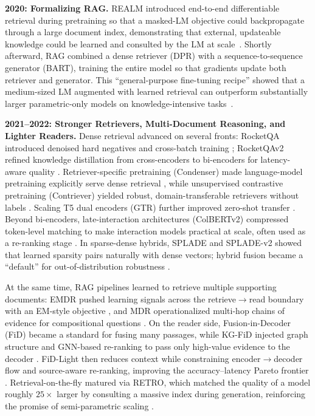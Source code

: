 \textbf{2020: Formalizing RAG.}
REALM introduced end-to-end differentiable retrieval during pretraining so that a masked-LM objective could backpropagate through a large document index, demonstrating that external, updateable knowledge could be learned and consulted by the LM at scale~\cite{realm2020}. Shortly afterward, RAG combined a dense retriever (DPR) with a sequence-to-sequence generator (BART), training the entire model so that gradients update both retriever and generator. This ``general-purpose fine-tuning recipe'' showed that a medium-sized LM augmented with learned retrieval can outperform substantially larger parametric-only models on knowledge-intensive tasks~\cite{lewis2020rag}.

\textbf{2021--2022: Stronger Retrievers, Multi-Document Reasoning, and Lighter Readers.}
Dense retrieval advanced on several fronts: RocketQA introduced denoised hard negatives and cross-batch training \cite{rocketqa2021}; RocketQAv2 refined knowledge distillation from cross-encoders to bi-encoders for latency-aware quality \cite{rocketqa2_2021}. Retriever-specific pretraining (Condenser) made language-model pretraining explicitly serve dense retrieval \cite{condenser2021}, while unsupervised contrastive pretraining (Contriever) yielded robust, domain-transferable retrievers without labels \cite{contriever2021}. Scaling T5 dual encoders (GTR) further improved zero-shot transfer \cite{gtr2021}. Beyond bi-encoders, late-interaction architectures (ColBERTv2) compressed token-level matching to make interaction models practical at scale, often used as a re-ranking stage \cite{colbertv2_2021}. In sparse-dense hybrids, SPLADE and SPLADE-v2 showed that learned sparsity pairs naturally with dense vectors; hybrid fusion became a ``default'' for out-of-distribution robustness \cite{splade2021, formal2021splade}.

At the same time, RAG pipelines learned to retrieve multiple supporting documents: EMDR pushed learning signals across the retrieve$\rightarrow$read boundary with an EM-style objective \cite{emdr2021}, and MDR operationalized multi-hop chains of evidence for compositional questions \cite{mdr2020}. On the reader side, Fusion-in-Decoder (FiD) became a standard for fusing many passages, while KG-FiD injected graph structure and GNN-based re-ranking to pass only high-value evidence to the decoder \cite{fid2020,kgfid2021}. FiD-Light then reduces context while constraining encoder$\rightarrow$decoder flow and source-aware re-ranking, improving the accuracy–latency Pareto frontier \cite{fidlight2022}. Retrieval-on-the-fly matured via RETRO, which matched the quality of a model roughly $25\times$ larger by consulting a massive index during generation, reinforcing the promise of semi-parametric scaling \cite{retro2021}.

